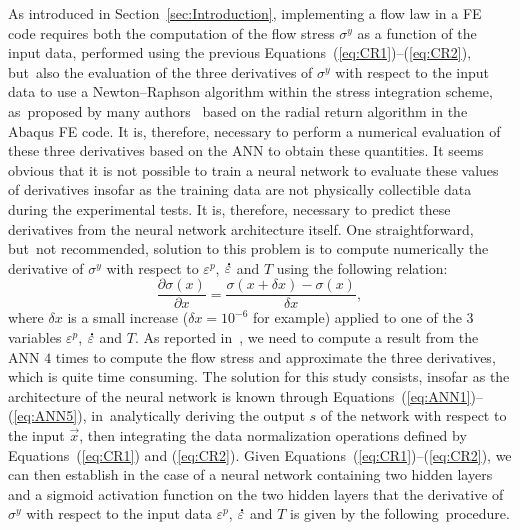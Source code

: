 \documentclass[algorithms,article,accept,pdftex,oneauthors]{Definitions/mdpi}
\DeclareRobustCommand{\mdot}[1]{\accentset{\mbox{\bfseries .}}{#1}}
\begin{document}
As introduced in Section~\ref{sec:Introduction}, implementing a flow law in a FE code requires both the computation of the flow stress $\sigma^y$ as a function of the input data, performed using the previous Equations~(\ref{eq:CR1})--(\ref{eq:CR2}), but~also the evaluation of the three derivatives of $\sigma^y$ with respect to the input data to use a Newton--Raphson algorithm within the stress integration scheme, as~proposed by many authors~\cite{Ponthot-2002, Ming-2018, Liang-2022, Simo-1998} based on the radial return algorithm in the Abaqus FE code.
It is, therefore, necessary to perform a numerical evaluation of these three derivatives based on the ANN to obtain these quantities.
It seems obvious that it is not possible to train a neural network to evaluate these values of derivatives insofar as the training data are not physically collectible data during the experimental tests.
It is, therefore, necessary to predict these derivatives from the neural network architecture itself.
One straightforward, but~not recommended, solution to this problem is to compute numerically the derivative of $\sigma^y$ with respect to $\varepsilon^p$, $\mdot\varepsilon$ and $T$ using the following relation:
\begin{equation}
\frac{\partial \sigma(x)}{\partial x} = \frac{\sigma(x+\delta x) - \sigma(x)}{\delta x},
\end{equation}
where $\delta x$ is a small increase ($\delta x=10^{-6}$ for example) applied to one of the $3$ variables $\varepsilon^p$, $\mdot\varepsilon$ and $T$.
As reported in~\cite{Pantale-2021}, we need to compute a result from the ANN  $4$ times to compute the flow stress and approximate the three derivatives, which is quite time consuming.
The solution for this study consists, insofar as the architecture of the neural network is known through Equations~(\ref{eq:ANN1})--(\ref{eq:ANN5}), in~analytically deriving the output $s$ of the network with respect to the input $\overrightarrow{x}$, then integrating the data normalization operations defined by Equations~(\ref{eq:CR1}) and (\ref{eq:CR2}).
Given Equations~(\ref{eq:CR1})--(\ref{eq:CR2}), we can then establish in the case of a neural network containing two hidden layers and a sigmoid activation function on the two hidden layers that the derivative of $\sigma^y$ with respect to the input data $\varepsilon^p$, $\mdot\varepsilon$ and $T$ is given by the following~procedure.
\end{document}
